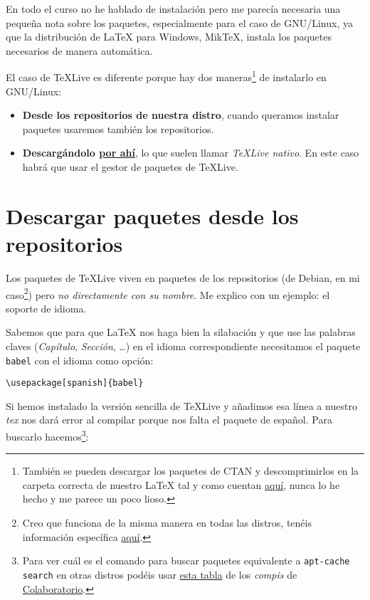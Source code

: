 En todo el curso no he hablado de instalación pero me parecía necesaria
una pequeña nota sobre los paquetes, especialmente para el caso de
GNU/Linux, ya que la distribución de LaTeX para Windows, MikTeX, instala
los paquetes necesarios de manera automática.

El caso de TeXLive es diferente porque hay dos maneras\footnote{También
  se pueden descargar los paquetes de CTAN y descomprimirlos en la
  carpeta correcta de nuestro LaTeX tal y como cuentan
  \href{https://en.wikibooks.org/wiki/LaTeX/Installing_Extra_Packages}{aquí},
  nunca lo he hecho y me parece un poco lioso.} de instalarlo en
GNU/Linux:

\begin{itemize}
\item
  \textbf{Desde los repositorios de nuestra distro}, cuando queramos
  instalar paquetes usaremos también los repositorios.
\item
  \textbf{Descargándolo
  \href{https://www.tug.org/texlive/doc/texlive-en/texlive-en.html\#installation}{por
  ahí}}, lo que suelen llamar \emph{TeXLive nativo}. En este caso habrá
  que usar el gestor de paquetes de TeXLive.
\end{itemize}

\section{Descargar paquetes desde los repositorios}

Los paquetes de TeXLive viven en paquetes de los repositorios (de
Debian, en mi caso\footnote{Creo que funciona de la misma manera en
  todas las distros, tenéis información específica
  \href{http://tug.org/texlive/distro.html}{aquí}.}) pero \emph{no
directamente con su nombre}. Me explico con un ejemplo: el soporte de
idioma.

Sabemos que para que LaTeX nos haga bien la silabación y que use las
palabras claves (\emph{Capítulo}, \emph{Sección}, \ldots{}) en el idioma
correspondiente necesitamos el paquete \lstinline!babel! con el idioma
como opción:

\begin{lstlisting}[language={[latex]tex}]
\usepackage[spanish]{babel}
\end{lstlisting}

Si hemos instalado la versión sencilla de TeXLive y añadimos esa línea a
nuestro \emph{tex} nos dará error al compilar porque nos falta el
paquete de español. Para buscarlo hacemos\footnote{Para ver cuál es el
  comando para buscar paquetes equivalente a
  \lstinline!apt-cache search! en otras distros podéis usar
  \href{https://colaboratorio.net/gestor-paquetes.html}{esta tabla} de
  los \emph{compis} de \href{https://colaboratorio.net/}{Colaboratorio}.}:

